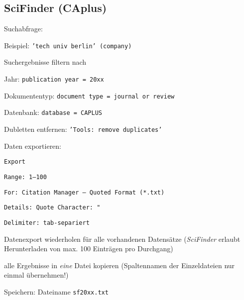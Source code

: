 \subsection*{SciFinder (CAplus)}
\begin{compactitem}
\item Suchabfrage:
	\begin{compactitem}
    \item Beispiel: \texttt{'tech univ berlin' (company)}
    \end{compactitem}
\item Suchergebnisse filtern nach
	\begin{compactitem}
    \item Jahr: \texttt{publication year = 20xx}
    \item Dokumententyp: \texttt{document type = journal or review}
    \item Datenbank: \texttt{database = CAPLUS}
    \end{compactitem}
\item Dubletten entfernen: \texttt{'Tools: remove duplicates'}
\item Daten exportieren: 
	\begin{compactitem}
    \item \texttt{Export}
    \item \texttt{Range: 1--100}
    \item \texttt{For: Citation Manager -- Quoted Format (*.txt)}
    \item \texttt{Details: Quote Character: "}
    \item \texttt{Delimiter: tab-separiert}
    \end{compactitem}
\item Datenexport wiederholen für alle vorhandenen Datensätze (\textit{SciFinder} erlaubt Herunterladen von max. 100 Einträgen pro Durchgang)
\item alle Ergebnisse in \textit{eine} Datei kopieren (Spaltennamen der Einzeldateien nur einmal übernehmen!)
\item Speichern: Dateiname \texttt{sf20xx.txt}
\end{compactitem}


